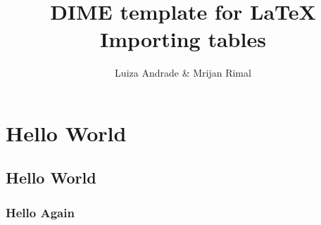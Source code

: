 \documentclass{article}                 %
\title{DIME template for \LaTeX \\ Importing tables} 	%
\author{Luiza Andrade \& Mrijan Rimal}
\begin{document}

    \maketitle
    \tableofcontents        %
    \listoftables			%

    \newpage    
    \section{Hello World} %
\subsection{Hello World}
\subsubsection{Hello Again}
    
\end{document}

